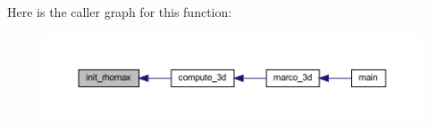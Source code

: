 Here is the caller graph for this function\+:
\nopagebreak
\begin{figure}[H]
\begin{center}
\leavevmode
\includegraphics[width=350pt]{Marco_8f90_a0ba9e9f35837a34d8df25a815723376a_icgraph}
\end{center}
\end{figure}
\mbox{\label{Marco_8f90_ac268fba86b567389312bb1f5945bec19}} 
